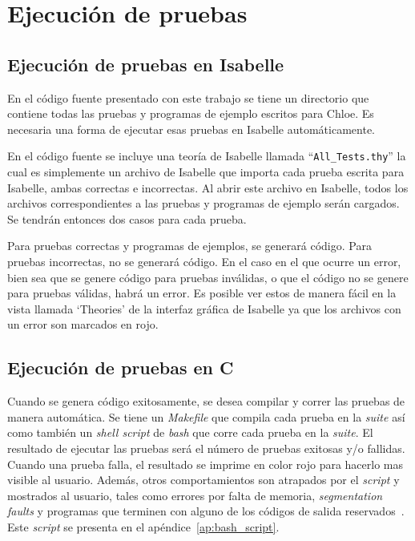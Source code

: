 \section{Ejecución de pruebas}

\subsection{Ejecución de pruebas en Isabelle}

En el código fuente presentado con este trabajo se tiene un directorio que contiene todas las pruebas y programas de ejemplo escritos para Chloe.
Es necesaria una forma de ejecutar esas pruebas en Isabelle automáticamente.

En el código fuente se incluye una teoría de Isabelle llamada ``\verb|All_Tests.thy|'' la cual es simplemente un archivo de Isabelle que importa cada prueba escrita para Isabelle, ambas correctas e incorrectas.
Al abrir este archivo en Isabelle, todos los archivos correspondientes a las pruebas y programas de ejemplo serán cargados.
Se tendrán entonces dos casos para cada prueba.

Para pruebas correctas y programas de ejemplos, se generará código.
Para pruebas incorrectas, no se generará código.
En el caso en el que ocurre un error, bien sea que se genere código para pruebas inválidas, o que el código no se genere para pruebas válidas, habrá un error.
Es posible ver estos de manera fácil en la vista llamada `Theories' de la interfaz gráfica de Isabelle ya que los archivos con un error son marcados en rojo.

\subsection{Ejecución de pruebas en C}

Cuando se genera código exitosamente, se desea compilar y correr las pruebas de manera automática.
Se tiene un \textit{Makefile} que compila cada prueba en la \textit{suite} así como también un \textit{shell script} de \textit{bash} que corre cada prueba en la \textit{suite}.
El resultado de ejecutar las pruebas será el número de pruebas exitosas y/o fallidas.
Cuando una prueba falla, el resultado se imprime en color rojo para hacerlo mas visible al usuario.
Además, otros comportamientos son atrapados por el \textit{script} y mostrados al usuario, tales como errores por falta de memoria, \textit{segmentation faults} y programas que terminen con alguno de los códigos de salida reservados~\cite{bash-scripting}.
Este \textit{script} se presenta en el apéndice~\ref{ap:bash_script}.

